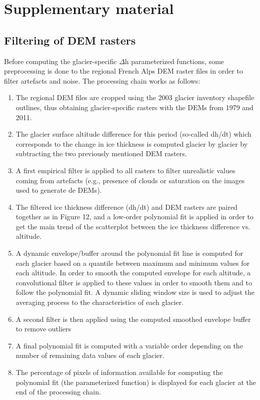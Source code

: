 \section{Supplementary material}

\subsection{Filtering of DEM rasters}

Before computing the glacier-specific $\Delta$h parameterized functions, some preprocessing is done to the regional French Alps DEM raster files in order to filter artefacts and noise. The processing chain works as follows:

\begin{enumerate}
 
\item The regional DEM files are cropped using the 2003 glacier inventory shapefile outlines, thus obtaining glacier-specific rasters with the DEMs from 1979 and 2011.
\item The glacier surface altitude difference for this period (so-called dh/dt) which corresponds to the change in ice thickness is computed glacier by glacier by subtracting the two previously mentioned DEM rasters.
\item A first empirical filter is applied to all rasters to filter unrealistic values coming from artefacts (e.g., presence of clouds or saturation on the images used to generate de DEMs).
\item The filtered ice thickness difference (dh/dt) and DEM rasters are paired together as in Figure 12, and a low-order polynomial fit is applied in order to get the main trend of the scatterplot between the ice thickness difference vs. altitude.
\item A dynamic envelope/buffer around the polynomial fit line is computed for each glacier based on a quantile between maximum and minimum values for each altitude. In order to smooth the computed envelope for each altitude, a convolutional filter is applied to these values in order to smooth them and to follow the polynomial fit. A dynamic sliding window size is used to adjust the averaging process to the characteristics of each glacier. 
\item A second filter is then applied using the computed smoothed envelope buffer to remove outliers
\item A final polynomial fit is computed with a variable order depending on the number of remaining data values of each glacier.
\item The percentage of pixels of information available for computing the polynomial fit (the parameterized function) is displayed for each glacier at the end of the processing chain.

\end{enumerate}
 
